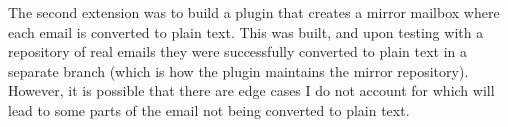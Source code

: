 The second extension was to build a plugin that creates a mirror mailbox where each email is converted to plain text. This was built, and upon testing with a repository of real emails they were successfully converted to plain text in a separate branch (which is how the plugin maintains the mirror repository). However, it is possible that there are edge cases I do not account for which will lead to some parts of the email not being converted to plain text.
